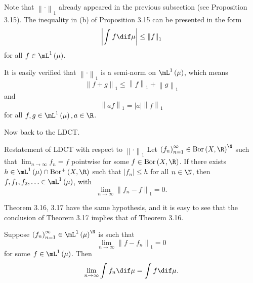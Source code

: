 \documentclass[pmath450]{subfiles}
\begin{document}
    Note that $\left\lVert \cdot\right\rVert_1$ already appeared in the previous subsection (see Proposition 3.15). The inequality in (b) of Proposition 3.15 can be presented in the form
    \begin{equation}
        \left| \int^{}_{}f\dif\mu \right|\leq \left\lVert f \right\rVert_{1}
    \end{equation}
    for all $f\in\lone\left( \mu \right)$.

    It is easily verified that $\left\lVert \cdot \right\rVert_{1}$ is a semi-norm on $\lone\left( \mu \right)$, which means
    \begin{equation*}
        \left\lVert f+g\right\rVert_1 \leq \left\lVert f \right\rVert_{1}+\left\lVert g \right\rVert_{1}
    \end{equation*} 
    and
    \begin{equation*}
        \left\lVert af \right\rVert_{1} = \left| a \right|\left\lVert f \right\rVert_{1}
    \end{equation*}
    for all $f,g\in\lone\left( \mu \right),a\in\R$. 

    Now back to the LDCT.

    \begin{theorem}{Restatement of LDCT with respect to $\left\lVert \cdot\right\rVert_1$}
        Let $\left( f_{n} \right)^{\infty}_{n=1}\in\bor\left( X,\R \right)^{\N}$ such that $\lim_{n\to\infty}f_n = f$ pointwise for some $f\in\bor\left( X,\R \right)$. If there exists $h\in\lone\left( \mu \right)\cap\borplus\left( X,\R \right)$ such that $\left| f_n \right|\leq h$ for all $n\in\N$, then $f, f_1, f_2, \ldots\in\lone\left( \mu \right)$, with
        \begin{equation*}
            \lim_{n\to\infty} \left\lVert f_n-f \right\rVert_{1} = 0.
        \end{equation*}
    \end{theorem}

    \rruleline

    \np Theorem 3.16, 3.17 have the same hypothesis, and it is easy to see that the conclusion of Theorem 3.17 implies that of Theorem 3.16.

    \begin{lemma}{}
        Suppose $\left( f_{n} \right)^{\infty}_{n=1}\in\lone\left( \mu \right)^{\N}$ is such that
        \begin{equation}
            \lim_{n\to\infty} \left\lVert f-f_n \right\rVert_{1} = 0
        \end{equation}
        for some $f\in\lone\left( \mu \right)$. Then
        \begin{equation}
            \lim_{n\to\infty} \int^{}_{}f_n\dif\mu = \int^{}_{}f\dif\mu.
        \end{equation}
    \end{lemma}
\end{document}
